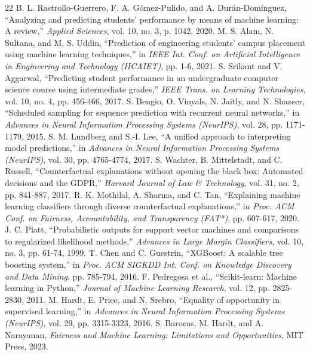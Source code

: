 \documentclass[conference]{IEEEtran}
\begin{document}
\begin{thebibliography}{22}
 B. L. Rastrollo-Guerrero, F. A. Gómez-Pulido, and A. Durán-Domínguez, ``Analyzing and predicting students' performance by means of machine learning: A review,'' \textit{Applied Sciences}, vol. 10, no. 3, p. 1042, 2020.
 M. S. Alam, N. Sultana, and M. S. Uddin, ``Prediction of engineering students' campus placement using machine learning techniques,'' in \textit{IEEE Int. Conf. on Artificial Intelligence in Engineering and Technology (IICAIET)}, pp. 1-6, 2021.
 S. Srikant and V. Aggarwal, ``Predicting student performance in an undergraduate computer science course using intermediate grades,'' \textit{IEEE Trans. on Learning Technologies}, vol. 10, no. 4, pp. 456-466, 2017.
 S. Bengio, O. Vinyals, N. Jaitly, and N. Shazeer, ``Scheduled sampling for sequence prediction with recurrent neural networks,'' in \textit{Advances in Neural Information Processing Systems (NeurIPS)}, vol. 28, pp. 1171-1179, 2015.
 S. M. Lundberg and S.-I. Lee, ``A unified approach to interpreting model predictions,'' in \textit{Advances in Neural Information Processing Systems (NeurIPS)}, vol. 30, pp. 4765-4774, 2017.
 S. Wachter, B. Mittelstadt, and C. Russell, ``Counterfactual explanations without opening the black box: Automated decisions and the GDPR,'' \textit{Harvard Journal of Law \& Technology}, vol. 31, no. 2, pp. 841-887, 2017.
 R. K. Mothilal, A. Sharma, and C. Tan, ``Explaining machine learning classifiers through diverse counterfactual explanations,'' in \textit{Proc. ACM Conf. on Fairness, Accountability, and Transparency (FAT*)}, pp. 607-617, 2020.
 J. C. Platt, ``Probabilistic outputs for support vector machines and comparisons to regularized likelihood methods,'' \textit{Advances in Large Margin Classifiers}, vol. 10, no. 3, pp. 61-74, 1999.
 T. Chen and C. Guestrin, ``XGBoost: A scalable tree boosting system,'' in \textit{Proc. ACM SIGKDD Int. Conf. on Knowledge Discovery and Data Mining}, pp. 785-794, 2016.
 F. Pedregosa et al., ``Scikit-learn: Machine learning in Python,'' \textit{Journal of Machine Learning Research}, vol. 12, pp. 2825-2830, 2011.
 M. Hardt, E. Price, and N. Srebro, ``Equality of opportunity in supervised learning,'' in \textit{Advances in Neural Information Processing Systems (NeurIPS)}, vol. 29, pp. 3315-3323, 2016.
 S. Barocas, M. Hardt, and A. Narayanan, \textit{Fairness and Machine Learning: Limitations and Opportunities}, MIT Press, 2023.

\end{thebibliography}
\end{document}
